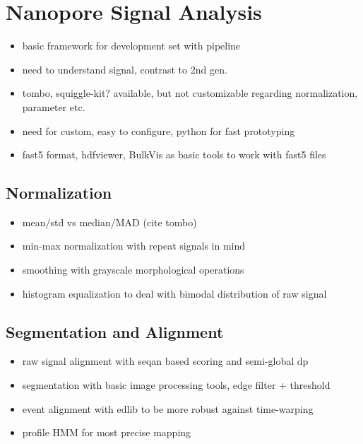 \chapter{Nanopore Signal Analysis}
\label{cha:signal}

\begin{itemize}
	\item basic framework for development set with pipeline
	\item need to understand signal, contrast to 2nd gen.
	\item tombo, squiggle-kit? available, but not customizable regarding normalization, parameter etc.
	\item need for custom, easy to configure, python for fast prototyping
	\item fast5 format, hdfviewer, BulkVis as basic tools to work with fast5 files
\end{itemize}

\section{Normalization}
\label{sec:signal:normalization}

\begin{itemize}
	\item mean/std vs median/MAD (cite tombo)
	\item min-max normalization with repeat signals in mind
	\item smoothing with grayscale morphological operations
	\item histogram equalization to deal with bimodal distribution of raw signal
\end{itemize}

\section{Segmentation and Alignment}
\label{sec:signal:alignment}

\begin{itemize}
	\item raw signal alignment with seqan based scoring and semi-global dp
	\item segmentation with basic image processing tools, edge filter + threshold
	\item event alignment with edlib to be more robust against time-warping
	\item profile HMM for most precise mapping
\end{itemize}


